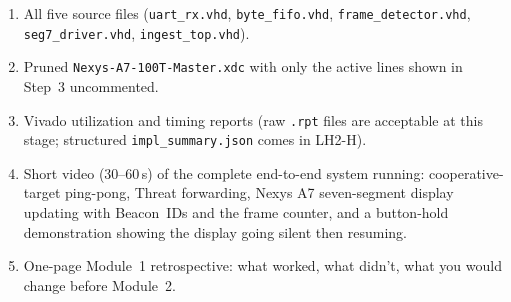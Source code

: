 \documentclass[11pt,letterpaper]{article}
\begin{document}
\newpage
\begin{tcolorbox}[deliverable={Lab Handout 1-H Deliverable --- and Module 1 Final Deliverable}]
	\begin{enumerate}[leftmargin=1.2em]
		\item All five \VHDL{} source files (\texttt{uart\_rx.vhd}, \texttt{byte\_fifo.vhd}, \texttt{frame\_detector.vhd}, \texttt{seg7\_driver.vhd}, \texttt{ingest\_top.vhd}).
		\item Pruned \texttt{Nexys-A7-100T-Master.xdc} with only the active lines shown in Step~3 uncommented.
		\item Vivado utilization and timing reports (raw \texttt{.rpt} files are acceptable at this stage; structured \texttt{impl\_summary.json} comes in LH2-H).
		\item Short video (30--60\,s) of the complete end-to-end system running: cooperative-target ping-pong, Threat forwarding, Nexys A7 seven-segment display updating with Beacon~IDs and the frame counter, and a button-hold demonstration showing the display going silent then resuming.
		\item One-page Module~1 retrospective: what worked, what didn't, what you would change before Module~2.
	\end{enumerate}
\end{tcolorbox}

\printhandoutglossary
\end{document}
